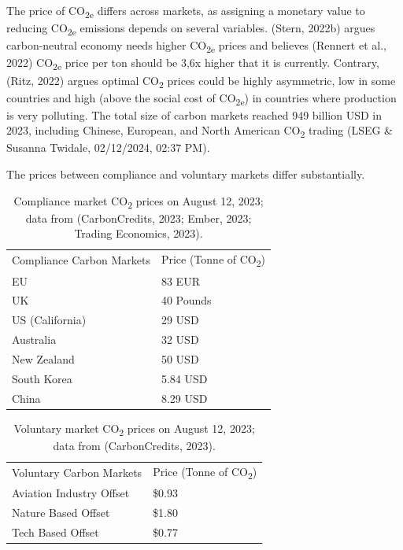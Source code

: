 \documentclass[
  12pt,
  letterpaper,
  DIV=11,
  numbers=noendperiod]{scrartcl}
\begin{document}
\let\pandoctableshortcapt\relax

The price of CO\textsubscript{2e} differs across markets, as assigning a
monetary value to reducing CO\textsubscript{2e} emissions depends on
several variables. (Stern, 2022b) argues carbon-neutral economy needs
higher CO\textsubscript{2e} prices and believes (Rennert et al., 2022)
CO\textsubscript{2e} price per ton should be 3,6x higher that it is
currently. Contrary, (Ritz, 2022) argues optimal CO\textsubscript{2}
prices could be highly asymmetric, low in some countries and high (above
the social cost of CO\textsubscript{2e}) in countries where production
is very polluting. The total size of carbon markets reached 949 billion
USD in 2023, including Chinese, European, and North American
CO\textsubscript{2} trading (LSEG \& Susanna Twidale, 02/12/2024, 02:37
PM).

The prices between compliance and voluntary markets differ
substantially.

\def\pandoctableshortcapt{Compliance Market CO\textsubscript{2} Prices}

\begin{longtable}[]{@{}ll@{}}
\caption[Compliance Market CO~2~ Prices]{Compliance market
CO\textsubscript{2} prices on August 12, 2023; data from (CarbonCredits,
2023; Ember, 2023; Trading Economics, 2023).}\tabularnewline
\toprule\noalign{}
\endfirsthead
\endhead
\bottomrule\noalign{}
\endlastfoot
Compliance Carbon Markets & Price (Tonne of CO\textsubscript{2}) \\
EU & 83 EUR \\
UK & 40 Pounds \\
US (California) & 29 USD \\
Australia & 32 USD \\
New Zealand & 50 USD \\
South Korea & 5.84 USD \\
China & 8.29 USD \\
\end{longtable}

\let\pandoctableshortcapt\relax

\def\pandoctableshortcapt{Voluntary Market CO\textsubscript{2} Prices}

\begin{longtable}[]{@{}ll@{}}
\caption[Voluntary Market CO~2~ Prices]{Voluntary market
CO\textsubscript{2} prices on August 12, 2023; data from (CarbonCredits,
2023).}\tabularnewline
\toprule\noalign{}
\endfirsthead
\endhead
\bottomrule\noalign{}
\endlastfoot
Voluntary Carbon Markets & Price (Tonne of CO\textsubscript{2}) \\
Aviation Industry Offset & \$0.93 \\
Nature Based Offset & \$1.80 \\
Tech Based Offset & \$0.77 \\
\end{longtable}
\end{document}
